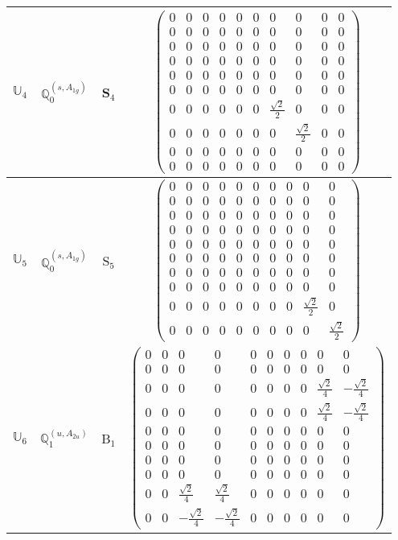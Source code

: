 \documentclass[fleqn,10pt,landscape]{article}
\begin{document}
\begin{itemize}
\begin{center}
\begin{longtable}{c|c|c|c}
$ \mathbb{U}_{4} $ & $\mathbb{Q}_{0}^{(s,A_{1g})}$ & S$_{4}$ & $\begin{pmatrix} 0 & 0 & 0 & 0 & 0 & 0 & 0 & 0 & 0 & 0 \\ 0 & 0 & 0 & 0 & 0 & 0 & 0 & 0 & 0 & 0 \\ 0 & 0 & 0 & 0 & 0 & 0 & 0 & 0 & 0 & 0 \\ 0 & 0 & 0 & 0 & 0 & 0 & 0 & 0 & 0 & 0 \\ 0 & 0 & 0 & 0 & 0 & 0 & 0 & 0 & 0 & 0 \\ 0 & 0 & 0 & 0 & 0 & 0 & 0 & 0 & 0 & 0 \\ 0 & 0 & 0 & 0 & 0 & 0 & \frac{\sqrt{2}}{2} & 0 & 0 & 0 \\ 0 & 0 & 0 & 0 & 0 & 0 & 0 & \frac{\sqrt{2}}{2} & 0 & 0 \\ 0 & 0 & 0 & 0 & 0 & 0 & 0 & 0 & 0 & 0 \\ 0 & 0 & 0 & 0 & 0 & 0 & 0 & 0 & 0 & 0 \end{pmatrix}$ \\ \hline
$ \mathbb{U}_{5} $ & $\mathbb{Q}_{0}^{(s,A_{1g})}$ & S$_{5}$ & $\begin{pmatrix} 0 & 0 & 0 & 0 & 0 & 0 & 0 & 0 & 0 & 0 \\ 0 & 0 & 0 & 0 & 0 & 0 & 0 & 0 & 0 & 0 \\ 0 & 0 & 0 & 0 & 0 & 0 & 0 & 0 & 0 & 0 \\ 0 & 0 & 0 & 0 & 0 & 0 & 0 & 0 & 0 & 0 \\ 0 & 0 & 0 & 0 & 0 & 0 & 0 & 0 & 0 & 0 \\ 0 & 0 & 0 & 0 & 0 & 0 & 0 & 0 & 0 & 0 \\ 0 & 0 & 0 & 0 & 0 & 0 & 0 & 0 & 0 & 0 \\ 0 & 0 & 0 & 0 & 0 & 0 & 0 & 0 & 0 & 0 \\ 0 & 0 & 0 & 0 & 0 & 0 & 0 & 0 & \frac{\sqrt{2}}{2} & 0 \\ 0 & 0 & 0 & 0 & 0 & 0 & 0 & 0 & 0 & \frac{\sqrt{2}}{2} \end{pmatrix}$ \\ \hline
$ \mathbb{U}_{6} $ & $\mathbb{Q}_{1}^{(u,A_{2u})}$ & B$_{1}$ & $\begin{pmatrix} 0 & 0 & 0 & 0 & 0 & 0 & 0 & 0 & 0 & 0 \\ 0 & 0 & 0 & 0 & 0 & 0 & 0 & 0 & 0 & 0 \\ 0 & 0 & 0 & 0 & 0 & 0 & 0 & 0 & \frac{\sqrt{2}}{4} & - \frac{\sqrt{2}}{4} \\ 0 & 0 & 0 & 0 & 0 & 0 & 0 & 0 & \frac{\sqrt{2}}{4} & - \frac{\sqrt{2}}{4} \\ 0 & 0 & 0 & 0 & 0 & 0 & 0 & 0 & 0 & 0 \\ 0 & 0 & 0 & 0 & 0 & 0 & 0 & 0 & 0 & 0 \\ 0 & 0 & 0 & 0 & 0 & 0 & 0 & 0 & 0 & 0 \\ 0 & 0 & 0 & 0 & 0 & 0 & 0 & 0 & 0 & 0 \\ 0 & 0 & \frac{\sqrt{2}}{4} & \frac{\sqrt{2}}{4} & 0 & 0 & 0 & 0 & 0 & 0 \\ 0 & 0 & - \frac{\sqrt{2}}{4} & - \frac{\sqrt{2}}{4} & 0 & 0 & 0 & 0 & 0 & 0 \end{pmatrix}$ \\

\end{longtable}
\end{center}
\end{itemize}
\end{document}
